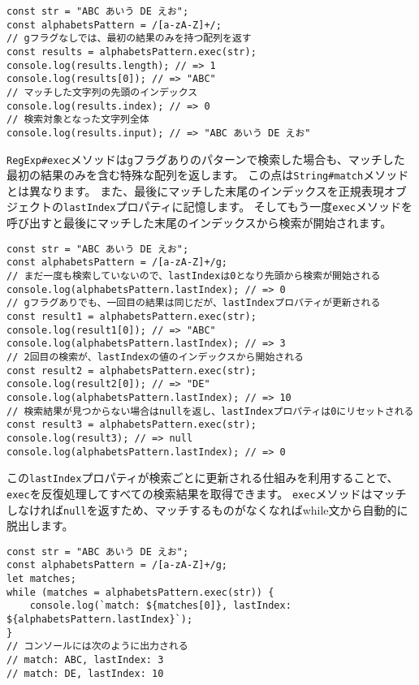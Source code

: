 \begin{lstlisting}
const str = "ABC あいう DE えお";
const alphabetsPattern = /[a-zA-Z]+/;
// gフラグなしでは、最初の結果のみを持つ配列を返す
const results = alphabetsPattern.exec(str);
console.log(results.length); // => 1
console.log(results[0]); // => "ABC"
// マッチした文字列の先頭のインデックス
console.log(results.index); // => 0
// 検索対象となった文字列全体
console.log(results.input); // => "ABC あいう DE えお"
\end{lstlisting}

\texttt{RegExp\#exec}メソッドは\texttt{g}フラグありのパターンで検索した場合も、マッチした最初の結果のみを含む特殊な配列を返します。
この点は\texttt{String\#match}メソッドとは異なります。
また、最後にマッチした末尾のインデックスを正規表現オブジェクトの\texttt{lastIndex}プロパティに記憶します。
そしてもう一度\texttt{exec}メソッドを呼び出すと最後にマッチした末尾のインデックスから検索が開始されます。

\begin{lstlisting}
const str = "ABC あいう DE えお";
const alphabetsPattern = /[a-zA-Z]+/g;
// まだ一度も検索していないので、lastIndexは0となり先頭から検索が開始される
console.log(alphabetsPattern.lastIndex); // => 0
// gフラグありでも、一回目の結果は同じだが、lastIndexプロパティが更新される
const result1 = alphabetsPattern.exec(str);
console.log(result1[0]); // => "ABC"
console.log(alphabetsPattern.lastIndex); // => 3
// 2回目の検索が、lastIndexの値のインデックスから開始される
const result2 = alphabetsPattern.exec(str);
console.log(result2[0]); // => "DE"
console.log(alphabetsPattern.lastIndex); // => 10
// 検索結果が見つからない場合はnullを返し、lastIndexプロパティは0にリセットされる
const result3 = alphabetsPattern.exec(str);
console.log(result3); // => null
console.log(alphabetsPattern.lastIndex); // => 0
\end{lstlisting}

この\texttt{lastIndex}プロパティが検索ごとに更新される仕組みを利用することで、\texttt{exec}を反復処理してすべての検索結果を取得できます。
\texttt{exec}メソッドはマッチしなければ\texttt{null}を返すため、マッチするものがなくなればwhile文から自動的に脱出します。

\begin{lstlisting}
const str = "ABC あいう DE えお";
const alphabetsPattern = /[a-zA-Z]+/g;
let matches;
while (matches = alphabetsPattern.exec(str)) {
    console.log(`match: ${matches[0]}, lastIndex: ${alphabetsPattern.lastIndex}`);
}
// コンソールには次のように出力される
// match: ABC, lastIndex: 3
// match: DE, lastIndex: 10
\end{lstlisting}

